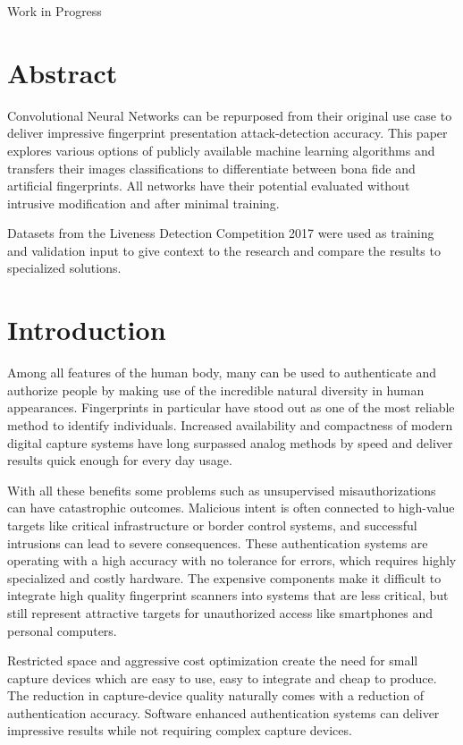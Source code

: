 \maketitle
\begin{center}
\huge Work in Progress
\end{center}
\section{Abstract}
Convolutional Neural Networks can be repurposed from their original use case to deliver impressive fingerprint presentation attack-detection accuracy.
This paper explores various options of publicly available machine learning algorithms and transfers their images classifications to differentiate between bona fide and artificial fingerprints.
All networks have their potential evaluated without intrusive modification and after minimal training.

\medskip\noindent
Datasets from the Liveness Detection Competition 2017 were used as training and validation input to give context to the research and compare the results to specialized solutions.


\section{Introduction}
Among all features of the human body, many can be used to authenticate and authorize people by making use of the incredible natural diversity in human appearances. 
Fingerprints in particular have stood out as one of the most reliable method to identify individuals.
Increased availability and compactness of modern digital capture systems have long surpassed analog methods by speed and deliver results quick enough for every day usage.

With all these benefits some problems such as unsupervised misauthorizations can have catastrophic outcomes.
Malicious intent is often connected to high-value targets like critical infrastructure or border control systems, and successful intrusions can lead to severe consequences.
These authentication systems are operating with a high accuracy with no tolerance for errors, which requires highly specialized and costly hardware.
The expensive components make it difficult to integrate high quality fingerprint scanners into systems that are less critical, but still represent attractive targets for unauthorized access like smartphones and personal computers.

Restricted space and aggressive cost optimization create the need for small capture devices which are easy to use, easy to integrate and cheap to produce. 
The reduction in capture-device quality naturally comes with a reduction of authentication accuracy.
Software enhanced authentication systems can deliver impressive results while not requiring complex capture devices.


